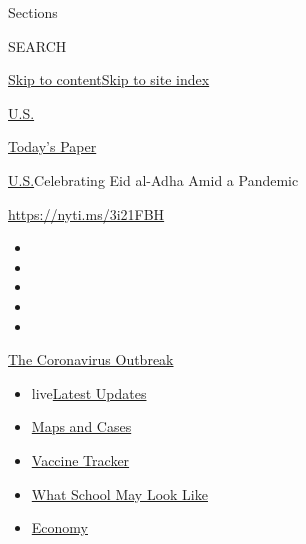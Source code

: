 Sections

SEARCH

\protect\hyperlink{site-content}{Skip to
content}\protect\hyperlink{site-index}{Skip to site index}

\href{https://www.nytimes.com/section/us}{U.S.}

\href{https://myaccount.nytimes.com/auth/login?response_type=cookie\&client_id=vi}{}

\href{https://www.nytimes.com/section/todayspaper}{Today's Paper}

\href{/section/us}{U.S.}\textbar{}Celebrating Eid al-Adha Amid a
Pandemic

\url{https://nyti.ms/3i21FBH}

\begin{itemize}
\item
\item
\item
\item
\item
\end{itemize}

\href{https://www.nytimes.com/news-event/coronavirus?action=click\&pgtype=Article\&state=default\&region=TOP_BANNER\&context=storylines_menu}{The
Coronavirus Outbreak}

\begin{itemize}
\tightlist
\item
  live\href{https://www.nytimes.com/2020/08/01/world/coronavirus-covid-19.html?action=click\&pgtype=Article\&state=default\&region=TOP_BANNER\&context=storylines_menu}{Latest
  Updates}
\item
  \href{https://www.nytimes.com/interactive/2020/us/coronavirus-us-cases.html?action=click\&pgtype=Article\&state=default\&region=TOP_BANNER\&context=storylines_menu}{Maps
  and Cases}
\item
  \href{https://www.nytimes.com/interactive/2020/science/coronavirus-vaccine-tracker.html?action=click\&pgtype=Article\&state=default\&region=TOP_BANNER\&context=storylines_menu}{Vaccine
  Tracker}
\item
  \href{https://www.nytimes.com/interactive/2020/07/29/us/schools-reopening-coronavirus.html?action=click\&pgtype=Article\&state=default\&region=TOP_BANNER\&context=storylines_menu}{What
  School May Look Like}
\item
  \href{https://www.nytimes.com/live/2020/07/31/business/stock-market-today-coronavirus?action=click\&pgtype=Article\&state=default\&region=TOP_BANNER\&context=storylines_menu}{Economy}
\end{itemize}

